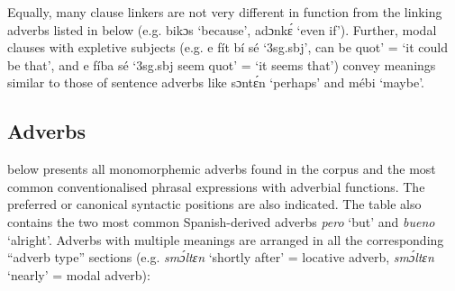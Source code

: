 Equally, many clause linkers are not very different in function from the linking adverbs listed in  below (e.g. bikɔs ‘because’, adɔnkɛ́ ‘even if’). Further, modal clauses with expletive subjects (e.g. e fít bí sé ‘3sg.sbj’, can be quot’ = ‘it could be that’, and e fíba sé ‘3sg.sbj seem quot’ = ‘it seems that’) convey meanings similar to those of sentence adverbs like sɔntɛ́n ‘perhaps’ and mébi ‘maybe’.


\subsection{Adverbs}\label{sec:7.7.1}
 below presents all monomorphemic adverbs found in the corpus and the most common conventionalised phrasal expressions with adverbial functions. The preferred or canonical syntactic positions are also indicated. The table also contains the two most common Spanish-derived adverbs \textit{pero} ‘but’ and \textit{bueno} ‘alright’. Adverbs with multiple meanings are arranged in all the corresponding “adverb type” sections (e.g. \textit{smɔ́ltɛn} ‘shortly after’ = locative adverb, \textit{smɔ́ltɛn} ‘nearly’ = modal adverb):

